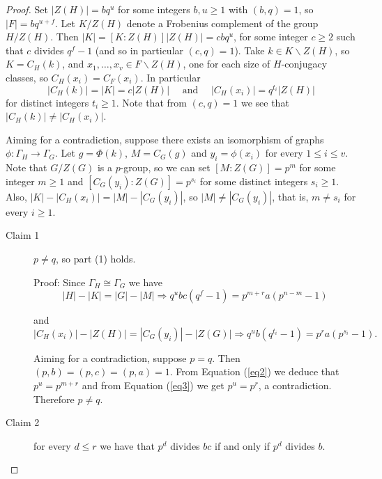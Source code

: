 \documentclass[10pt,a4paper]{amsart}
\begin{document}
\begin{proof}
Set $|Z(H)| = bq^u$ for some integers $b, u \geq 1$ with $(b,q)=1$, so $|F| = bq^{u+f}$.  
Let $K/Z(H)$ denote a Frobenius complement of the group $H/Z(H)$. Then 
$|K| = [K \colon Z(H)]|Z(H)| = cbq^u$, for some integer $c\geq 2$ such that  $c$ divides $q^f -1$ (and so in particular $(c,q) = 1$). 
Take $k \in K \backslash Z(H)$, so $K = C_H(k)$, and $x_1, \dots, x_v \in F \backslash Z(H)$, one for each size of $H$-conjugacy classes, so $C_H(x_i) = C_F(x_i)$. In particular 
\[|C_H(k)| = |K| = c|Z(H)| \quad \text{ and } \quad |C_H(x_i)| = q^{t_i}|Z(H)|\] for distinct integers $t_i\geq 1$. Note that from $(c,q)=1$ we see that $|C_H(k)| \neq |C_H(x_i)|$.

Aiming for a contradiction, suppose there exists an isomorphism of graphs
$\phi \colon \Gamma_H \rightarrow \Gamma_G$. Let $g= \Phi(k)$, $M=C_G(g)$ and $y_i=\phi(x_i)$ for every $1 \leq i \leq v$. Note that $G/Z(G)$ is a $p$-group, so we can set $[M \colon Z(G)] = p^m$  for some integer $m\geq 1$ and $[C_G(y_i) \colon Z(G)]=p^{s_i}$ for some distinct integers $s_i\geq 1$.
Also, $|K| - |C_H(x_i)| = |M| - |C_G(y_i)|$, so $|M| \neq |C_G(y_i)|$, that is, $m \neq s_i$ for every $i\geq 1$.

\begin{description}
\item[Claim 1] $p \neq q$, so part (1) holds.

\smallskip
\noindent
Proof: 
Since $\Gamma_H \cong \Gamma_G$ we have
\begin{equation}\label{eq2}|H| - |K| = |G| - |M| \Longrightarrow
q^ubc(q^f- 1) = p^{m+r}a(p^{n-m}- 1)\end{equation}

\vspace{0.2cm}
and
\begin{equation}\label{eq3} |C_H(x_i)| - |Z(H)| = |C_G(y_i)| - |Z(G)| \Longrightarrow
q^ub(q^{t_i} - 1) = p^{r}a(p^{s_i}- 1) .\end{equation}

Aiming for a contradiction, suppose $p=q$. Then $(p,b)=(p,c)=(p,a)=1$. From Equation (\ref{eq2}) we deduce that $p^ u = p^{m+r}$ and  from Equation (\ref{eq3}) we get $p^ u = p^{r}$, a contradiction. Therefore $p\neq q$.

\bigskip
\item[Claim 2] for every $d\leq r$ we have that $p^d$ divides $bc$ if and only if $p^d$ divides $b$.


\end{description}
\end{proof}
\end{document}
